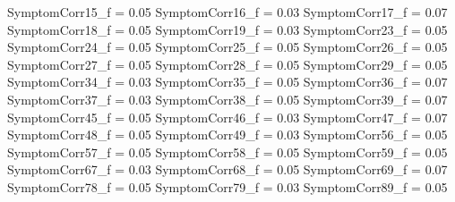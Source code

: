 \documentclass[]{article}
\newenvironment{Shaded}{\begin{snugshade}}{\end{snugshade}}
\newcommand{\FloatTok}[1]{\textcolor[rgb]{0.00,0.00,0.81}{#1}}
\newcommand{\StringTok}[1]{\textcolor[rgb]{0.31,0.60,0.02}{#1}}
\newcommand{\NormalTok}[1]{#1}
\begin{document}
\begin{Shaded}
\begin{Highlighting}[]
\NormalTok{SymptomCorr15_f =}\StringTok{ }\FloatTok{0.05}
\NormalTok{SymptomCorr16_f =}\StringTok{ }\FloatTok{0.03}
\NormalTok{SymptomCorr17_f =}\StringTok{ }\FloatTok{0.07}
\NormalTok{SymptomCorr18_f =}\StringTok{ }\FloatTok{0.05}
\NormalTok{SymptomCorr19_f =}\StringTok{ }\FloatTok{0.03}
\NormalTok{SymptomCorr23_f =}\StringTok{ }\FloatTok{0.05}
\NormalTok{SymptomCorr24_f =}\StringTok{ }\FloatTok{0.05}
\NormalTok{SymptomCorr25_f =}\StringTok{ }\FloatTok{0.05}
\NormalTok{SymptomCorr26_f =}\StringTok{ }\FloatTok{0.05}
\NormalTok{SymptomCorr27_f =}\StringTok{ }\FloatTok{0.05}
\NormalTok{SymptomCorr28_f =}\StringTok{ }\FloatTok{0.05}
\NormalTok{SymptomCorr29_f =}\StringTok{ }\FloatTok{0.05}
\NormalTok{SymptomCorr34_f =}\StringTok{ }\FloatTok{0.03}
\NormalTok{SymptomCorr35_f =}\StringTok{ }\FloatTok{0.05}
\NormalTok{SymptomCorr36_f =}\StringTok{ }\FloatTok{0.07}
\NormalTok{SymptomCorr37_f =}\StringTok{ }\FloatTok{0.03}
\NormalTok{SymptomCorr38_f =}\StringTok{ }\FloatTok{0.05}
\NormalTok{SymptomCorr39_f =}\StringTok{ }\FloatTok{0.07}
\NormalTok{SymptomCorr45_f =}\StringTok{ }\FloatTok{0.05}
\NormalTok{SymptomCorr46_f =}\StringTok{ }\FloatTok{0.03}
\NormalTok{SymptomCorr47_f =}\StringTok{ }\FloatTok{0.07}
\NormalTok{SymptomCorr48_f =}\StringTok{ }\FloatTok{0.05}
\NormalTok{SymptomCorr49_f =}\StringTok{ }\FloatTok{0.03}
\NormalTok{SymptomCorr56_f =}\StringTok{ }\FloatTok{0.05}
\NormalTok{SymptomCorr57_f =}\StringTok{ }\FloatTok{0.05}
\NormalTok{SymptomCorr58_f =}\StringTok{ }\FloatTok{0.05}
\NormalTok{SymptomCorr59_f =}\StringTok{ }\FloatTok{0.05}
\NormalTok{SymptomCorr67_f =}\StringTok{ }\FloatTok{0.03}
\NormalTok{SymptomCorr68_f =}\StringTok{ }\FloatTok{0.05}
\NormalTok{SymptomCorr69_f =}\StringTok{ }\FloatTok{0.07}
\NormalTok{SymptomCorr78_f =}\StringTok{ }\FloatTok{0.05}
\NormalTok{SymptomCorr79_f =}\StringTok{ }\FloatTok{0.03}
\NormalTok{SymptomCorr89_f =}\StringTok{ }\FloatTok{0.05}



\end{Highlighting}
\end{Shaded}
\end{document}
